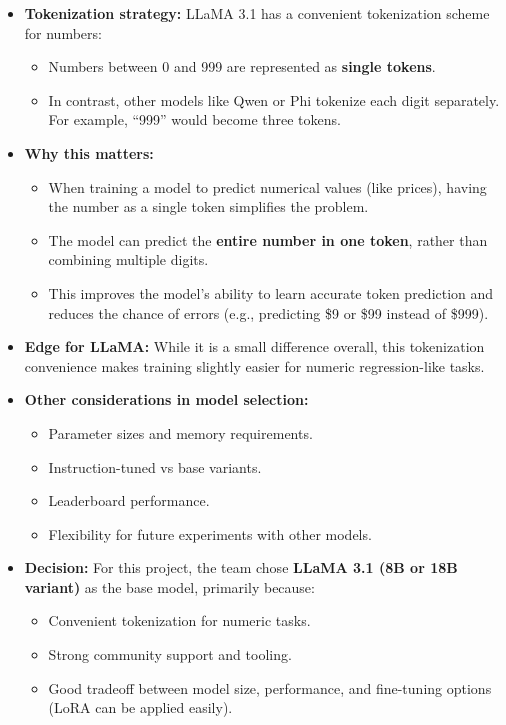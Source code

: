 \begin{itemize}
    \item \textbf{Tokenization strategy:} LLaMA 3.1 has a convenient tokenization scheme for numbers:
    \begin{itemize}
        \item Numbers between 0 and 999 are represented as \textbf{single tokens}.
        \item In contrast, other models like Qwen or Phi tokenize each digit separately. For example, ``999'' would become three tokens.
    \end{itemize}

    \item \textbf{Why this matters:}
    \begin{itemize}
        \item When training a model to predict numerical values (like prices), having the number as a single token simplifies the problem.
        \item The model can predict the \textbf{entire number in one token}, rather than combining multiple digits.
        \item This improves the model's ability to learn accurate token prediction and reduces the chance of errors (e.g., predicting \$9 or \$99 instead of \$999).
    \end{itemize}

    \item \textbf{Edge for LLaMA:} While it is a small difference overall, this tokenization convenience makes training slightly easier for numeric regression-like tasks.
    
    \item \textbf{Other considerations in model selection:}
    \begin{itemize}
        \item Parameter sizes and memory requirements.
        \item Instruction-tuned vs base variants.
        \item Leaderboard performance.
        \item Flexibility for future experiments with other models.
    \end{itemize}
    
    \item \textbf{Decision:} For this project, the team chose \textbf{LLaMA 3.1 (8B or 18B variant)} as the base model, primarily because:
    \begin{itemize}
        \item Convenient tokenization for numeric tasks.
        \item Strong community support and tooling.
        \item Good tradeoff between model size, performance, and fine-tuning options (LoRA can be applied easily).
    \end{itemize}
\end{itemize}

